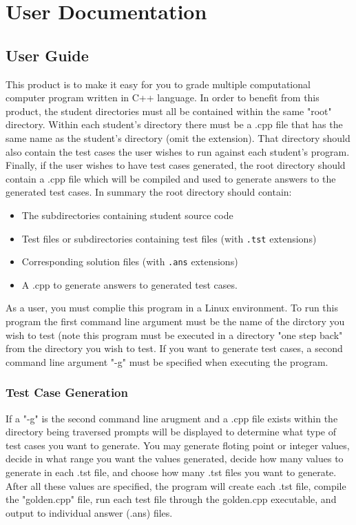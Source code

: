 
\chapter{User Documentation}


\section{User Guide}

This product is to make it easy for you to grade multiple computational computer program written in C++ language. In order to benefit from this product, the student directories must all be contained within the same "root" directory.
Within each student's directory there must be a .cpp file that has the same name as the student's directory (omit the extension). That directory should also contain the test cases the user wishes to run against each student's program.
Finally, if the user wishes to have test cases generated, the root directory should contain a .cpp file which will be compiled and used to generate answers to the generated test cases. In summary the root directory should contain:
    \begin{itemize}
  		\item The subdirectories containing student source code
  		\item Test files or subdirectories containing test files (with {\tt .tst} extensions)
  		\item Corresponding solution files (with {\tt .ans} extensions)
        \item A .cpp to generate answers to generated test cases. 
	\end{itemize} 

As a user, you must complie this program in a Linux environment. To run this program the first command line argument must be the name of the dirctory you wish to test (note this program must be executed in a directory "one step back" from the directory you wish to test. If you want to generate test cases, a second command line argument "-g" must be specified when executing the program. 



\subsection {Test Case Generation}
If a "-g" is the second command line arugment and a .cpp file exists within the directory being traversed prompts will be displayed to determine what type of test cases you want to generate. You may generate floting point or integer values, decide in what range you want the values generated, decide how many values to generate in each .tst file, and choose how many .tst files you want to generate. After all these values are specified, the program will create each .tst file, compile the "golden.cpp" file, run each test file through the golden.cpp executable, and output to individual answer (.ans) files.

